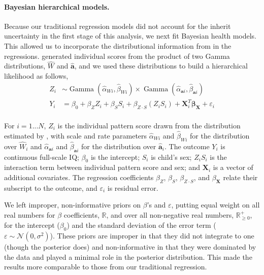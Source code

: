 \paragraph{Bayesian hierarchical models.} Because our traditional regression models did not account for the inherit uncertainty in the first stage of this analysis, we next fit Bayesian health models. This allowed us to incorporate the distributional information from \bnmf in the regressions. \bnmf generated individual scores from the product of two Gamma distributions, $\widehat{W}$ and $\widehat{\mathbf{a}}$, and we used these distributions to build a hierarchical likelihood as follows,
\begin{equation}
\begin{aligned}
Z_i & \sim \operatorname{Gamma}(\widehat{\alpha}_{W i}, \widehat{\beta}_{W i}) 
    \times \operatorname{Gamma}(\widehat{\alpha}_{\mathbf{a} i},
    \widehat{\beta}_{\mathbf{a} i})  \\
Y_i & = \beta_0 + \beta_Z Z_i + \beta_{S} S_i 
+ \beta_{Z \cdot S} \left(Z_i S_i\right) 
+ \mathbf{X}_{i}^T\boldsymbol{\beta}_\mathbf{X} + \varepsilon_i \\
\end{aligned}
\end{equation}

For $i = 1 ... N$, $Z_i$ is the individual pattern score drawn from the distribution estimated by \bnmfc, with scale and rate parameters $\widehat{\alpha}_{W i}$ and $\widehat{\beta}_{W i}$ for the distribution over $\widehat{W}_i$ and $\widehat{\alpha}_{\mathbf{a} i}$ and $\widehat{\beta}_{\mathbf{a} i}$ for the distribution over $\widehat{\mathbf{a}}_i$. The outcome $Y_i$ is continuous full-scale IQ; $\beta_0$ is the intercept;  $S_i$ is child's sex; $Z_i S_i$ is the interaction term between individual pattern score and sex; and $\mathbf{X}_{i}$ is a vector of additional covariates. The regression coefficients \(\beta_Z\), \(\beta_S\), \(\beta_{Z \cdot S}\), and \(\beta_\mathbf{X}\) relate their subscript to the outcome, and $\varepsilon_i$ is residual error.

We left improper, non-informative priors on $\beta$'s and $\varepsilon$, putting equal weight on all real numbers for $\beta$ coefficients, \(\mathbb R \), and over all non-negative real numbers, \(\mathbb R_{\geq 0}^+\), for the intercept ($\beta_0$) and the standard deviation of the error term ($\varepsilon \sim \mathcal{N}(0,\sigma^2)$). These priors are improper in that they did not integrate to one (though the posterior does) and non-informative in that they were dominated by the data and played a minimal role in the posterior distribution. This made the results more comparable to those from our traditional regression.

